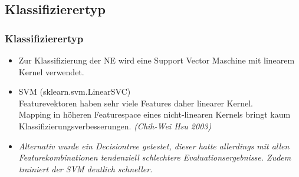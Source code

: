 \documentclass{beamer}
\begin{document}
	\subsection{Klassifizierertyp}
	\begin{frame}
		\frametitle{Klassifizierertyp}
		\begin{itemize}
			\item<+->Zur Klassifizierung der NE wird eine Support Vector Maschine mit linearem Kernel verwendet.
			\item<+-> SVM (sklearn.svm.LinearSVC)\\
						
			Featurevektoren haben sehr viele Features
			daher linearer Kernel.\\
			Mapping in höheren Featurespace eines nicht-linearen Kernels bringt kaum Klassifizierungsverbesserungen. \textit{(Chih-Wei Hsu 2003)}
			\item<+->\textit{Alternativ wurde ein Decisiontree getestet, dieser hatte allerdings mit allen Featurekombinationen tendenziell schlechtere Evaluationsergebnisse. Zudem trainiert der SVM deutlich schneller.}
		\end{itemize}
	\end{frame}
\end{document}
